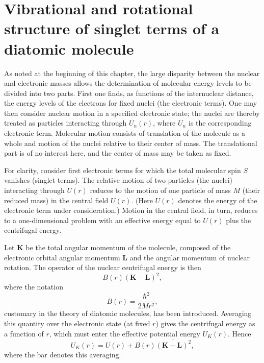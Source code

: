 \section[Singlet-term vibration and rotation]{Vibrational and rotational structure of singlet terms of a diatomic molecule}

As noted at the beginning of this chapter, the large disparity between the nuclear and electronic masses allows the determination of molecular energy levels to be divided into two parts. First one finds, as functions of the internuclear distance, the energy levels of the electrons for fixed nuclei (the electronic terms). One may then consider nuclear motion in a specified electronic state; the nuclei are thereby treated as particles interacting through $U_n(r)$, where $U_n$ is the corresponding electronic term. Molecular motion consists of translation of the molecule as a whole and motion of the nuclei relative to their center of mass. The translational part is of no interest here, and the center of mass may be taken as fixed.

For clarity, consider first electronic terms for which the total molecular spin $S$ vanishes (singlet terms). The relative motion of two particles (the nuclei) interacting through $U(r)$ reduces to the motion of one particle of mass $M$ (their reduced mass) in the central field $U(r)$. (Here $U(r)$ denotes the energy of the electronic term under consideration.) Motion in the central field, in turn, reduces to a one-dimensional problem with an effective energy equal to $U(r)$ plus the centrifugal energy.

Let $\mathbf K$ be the total angular momentum of the molecule, composed of the electronic orbital angular momentum $\mathbf L$ and the angular momentum of nuclear rotation. The operator of the nuclear centrifugal energy is then
\[B(r)(\mathbf K-\mathbf L)^2,\]
where the notation
\begin{equation}B(r)=\frac{\hbar^2}{2Mr^2},\tag{82.1}\end{equation}
customary in the theory of diatomic molecules, has been introduced. Averaging this quantity over the electronic state (at fixed $r$) gives the centrifugal energy as a function of $r$, which must enter the effective potential energy $U_K(r)$. Hence
\begin{equation}U_K(r)=U(r)+B(r)\overline{(\mathbf K-\mathbf L)^2},\tag{82.2}\end{equation}
where the bar denotes this averaging.

